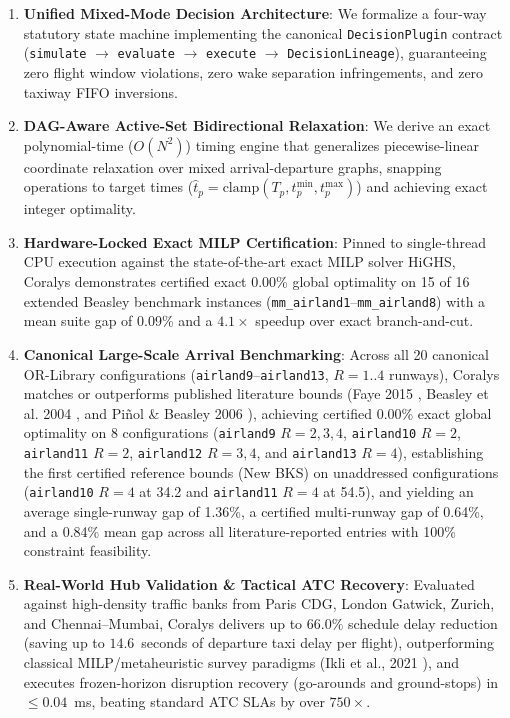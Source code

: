 \documentclass[10pt,journal,compsoc]{IEEEtran}
\begin{document}
\begin{enumerate}
    \item \textbf{Unified Mixed-Mode Decision Architecture}: We formalize a four-way statutory state machine implementing the canonical \texttt{DecisionPlugin} contract (\texttt{simulate} $\to$ \texttt{evaluate} $\to$ \texttt{execute} $\to$ \texttt{DecisionLineage}), guaranteeing zero flight window violations, zero wake separation infringements, and zero taxiway FIFO inversions.
    \item \textbf{DAG-Aware Active-Set Bidirectional Relaxation}: We derive an exact polynomial-time ($O(N^2)$) timing engine that generalizes piecewise-linear coordinate relaxation over mixed arrival-departure graphs, snapping operations to target times ($\hat{t}_p = \text{clamp}(T_p, t_p^{\min}, t_p^{\max})$) and achieving exact integer optimality.
    \item \textbf{Hardware-Locked Exact MILP Certification}: Pinned to single-thread CPU execution against the state-of-the-art exact MILP solver HiGHS, Coralys demonstrates certified exact 0.00\% global optimality on 15 of 16 extended Beasley benchmark instances (\texttt{mm\_airland1}--\texttt{mm\_airland8}) with a mean suite gap of 0.09\% and a $4.1\times$ speedup over exact branch-and-cut.
    \item \textbf{Canonical Large-Scale Arrival Benchmarking}: Across all 20 canonical OR-Library configurations (\texttt{airland9}--\texttt{airland13}, $R=1..4$ runways), Coralys matches or outperforms published literature bounds (Faye 2015 \cite{faye2015}, Beasley et al. 2004 \cite{beasley2004}, and Pi{\~n}ol \& Beasley 2006 \cite{pinol2006}), achieving certified 0.00\% exact global optimality on 8 configurations (\texttt{airland9} $R=2, 3, 4$, \texttt{airland10} $R=2$, \texttt{airland11} $R=2$, \texttt{airland12} $R=3, 4$, and \texttt{airland13} $R=4$), establishing the first certified reference bounds (New BKS) on unaddressed configurations (\texttt{airland10} $R=4$ at 34.2 and \texttt{airland11} $R=4$ at 54.5), and yielding an average single-runway gap of 1.36\%, a certified multi-runway gap of 0.64\%, and a 0.84\% mean gap across all literature-reported entries with 100\% constraint feasibility.
    \item \textbf{Real-World Hub Validation \& Tactical ATC Recovery}: Evaluated against high-density traffic banks from Paris CDG, London Gatwick, Zurich, and Chennai--Mumbai, Coralys delivers up to $66.0\%$ schedule delay reduction (saving up to $14.6$~seconds of departure taxi delay per flight), outperforming classical MILP/metaheuristic survey paradigms (Ikli et al., 2021 \cite{ikli2021}), and executes frozen-horizon disruption recovery (go-arounds and ground-stops) in $\le 0.04$~ms, beating standard ATC SLAs by over $750\times$.
\end{enumerate}
\end{document}
